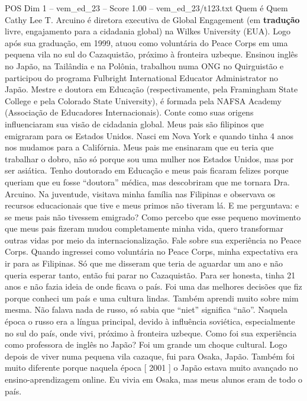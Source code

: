 \begin{textsample}{POS Dim 1 – vem\_ed\_23 – Score 1.00 – vem\_ed\_23/t123.txt}  \label{ex:f1_pos_018}
Quem é Quem Cathy Lee T.
Arcuino é diretora executiva de Global Engagement (em \textbf{tradução} livre, engajamento para a cidadania global) na Wilkes University (EUA).
Logo após sua graduação, em 1999, atuou como voluntária do Peace Corps em uma pequena vila no sul do Cazaquistão, próximo à fronteira uzbeque.
Ensinou inglês no Japão, na Tailândia e na Polônia, trabalhou numa ONG no Quirguistão e participou do programa Fulbright International Educator Administrator no Japão.
Mestre e doutora em Educação (respectivamente, pela Framingham State College e pela Colorado State University), é formada pela NAFSA Academy (Associação de Educadores Internacionais).
Conte como suas origens influenciaram sua visão de cidadania global.
Meus pais são filipinos que emigraram para os Estados Unidos.
Nasci em Nova York e quando tinha 4 anos nos mudamos para a Califórnia.
Meus pais me ensinaram que eu teria que trabalhar o dobro, não só porque sou uma mulher nos Estados Unidos, mas por ser asiática.
Tenho doutorado em Educação e meus pais ficaram felizes porque queriam que eu fosse “doutora” médica, mas descobriram que me tornara Dra.
Arcuino.
Na juventude, visitava minha família nas Filipinas e observava os recursos educacionais que tive e meus primos não tiveram lá.
E me perguntava: e se meus pais não tivessem emigrado?
Como percebo que esse pequeno movimento que meus pais fizeram mudou completamente minha vida, quero transformar outras vidas por meio da internacionalização.
Fale sobre sua experiência no Peace Corps.
Quando ingressei como voluntária no Peace Corps, minha expectativa era ir para as Filipinas.
Só que me disseram que teria de aguardar um ano e não queria esperar tanto, então fui parar no Cazaquistão.
Para ser honesta, tinha 21 anos e não fazia ideia de onde ficava o país.
Foi uma das melhores decisões que fiz porque conheci um país e uma cultura lindas.
Também aprendi muito sobre mim mesma.
Não falava nada de russo, só sabia que “niet” significa “não”.
Naquela época o russo era a língua principal, devido à influência soviética, especialmente no sul do país, onde vivi, próximo à fronteira uzbeque.
Como foi sua experiência como professora de inglês no Japão?
Foi um grande um choque cultural.
Logo depois de viver numa pequena vila cazaque, fui para Osaka, Japão.
Também foi muito diferente porque naquela época [ 2001 ] o Japão estava muito avançado no ensino-aprendizagem online.
Eu vivia em Osaka, mas meus alunos eram de todo o país.

\end{textsample}
